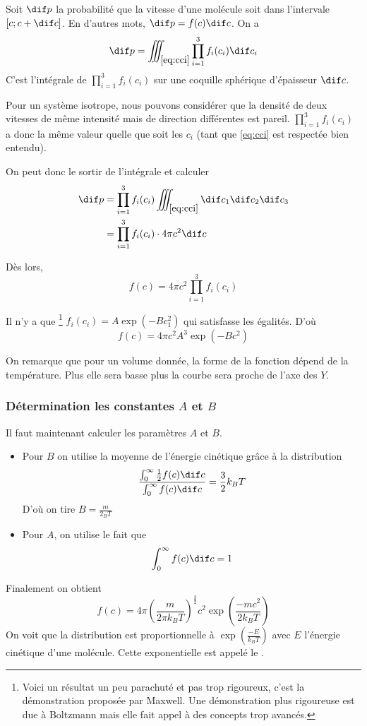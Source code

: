 Soit $\dif p$ la probabilité que la vitesse d'une molécule soit
dans l'intervale $[c; c + \dif c]$.
En d'autres mots, $\dif p = f(c) \dif c$.
On a
\[ \dif p = \iiint_{\eqref{eq:cci}} \prod_{i=1}^3 f_i(c_i) \dif c_i \]
C'est l'intégrale de $\prod_{i=1}^3 f_i(c_i)$ sur une coquille sphérique
d'épaisseur $\dif c$.

Pour un système isotrope, nous pouvons considérer que
la densité de deux vitesses de même intensité mais de direction
différentes est pareil.
$\prod_{i=1}^3 f_i(c_i)$ a donc la même valeur
quelle que soit les $c_i$ (tant que \eqref{eq:cci} est respectée bien entendu).

On peut donc le sortir de l'intégrale et calculer
\begin{align*}
  \dif p & = \prod_{i=1}^3 f_i(c_i)
  \iiint_{\eqref{eq:cci}} \dif c_1 \dif c_2 \dif c_3\\
  & = \prod_{i=1}^3 f_i(c_i) \cdot 4\pi c^2 \dif c
\end{align*}

Dès lors,
\[ f(c) = 4\pi c^2 \prod_{i=1}^3 f_i(c_i) \]

Il n'y a que
\footnote{Voici un résultat un peu parachuté et pas trop rigoureux,
c'est la démonstration proposée par Maxwell.
Une démonstration plus rigoureuse est due à Boltzmann
mais elle fait appel à des concepts trop avancés.}
$f_i(c_i) = A \exp(-Bc_1^2)$ qui satisfasse les égalités. D'où
\[ f(c) = 4\pi c^2 A^3 \exp (-Bc^2) \]

On remarque que pour un volume donnée,
la forme de la fonction dépend de la température.
Plus elle sera basse plus la courbe sera proche de l'axe des $Y$.

\subsubsection{Détermination les constantes $A$ et $B$}
Il faut maintenant calculer les paramètres $A$ et $B$.
\begin{itemize}
  \item Pour $B$ on utilise la moyenne de
    l'énergie cinétique grâce à la distribution
    \[ \frac{\int_0^{\infty}\frac 12 f(c)\dif c}{\int^{\infty}_0 f(c) \dif c}
    = \frac 32k_BT \]
    D'où on tire $B = \frac m{2_BT}$
  \item Pour $A$, on utilise le fait que
    \[ \int_0^{\infty} f(c) \dif c = 1 \]
\end{itemize}
Finalement on obtient
\[ f(c) = 4\pi \left(\frac{m}{2\pi k_BT}\right)^\frac 32
c^2 \exp\left(\frac{-mc^2}{2k_BT}\right) \]
On voit que la distribution est proportionnelle à
$\exp \left(\frac{-E}{k_BT}\right)$ avec $E$ l'énergie cinétique d'une molécule.
Cette exponentielle est appelé le .

